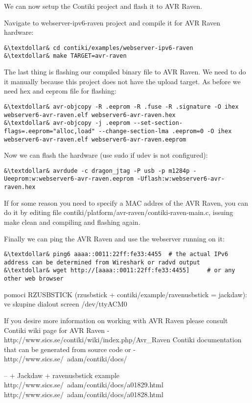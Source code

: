 \documentclass{article}
\begin{document}
We can now setup the Contiki project and flash it to AVR Raven.

Navigate to webserver-ipv6-raven project and compile it for AVR Raven hardware:
\begin{lstlisting}
&\textdollar& cd contiki/examples/webserver-ipv6-raven
&\textdollar& make TARGET=avr-raven
\end{lstlisting}


The last thing is flashing our compiled binary file to AVR Raven. We need to do it manually because this project does not have the upload target.
As before we need hex and eeprom file for flashing:
\begin{lstlisting}
&\textdollar& avr-objcopy -R .eeprom -R .fuse -R .signature -O ihex webserver6-avr-raven.elf webserver6-avr-raven.hex
&\textdollar& avr-objcopy -j .eeprom --set-section-flags=.eeprom="alloc,load" --change-section-lma .eeprom=0 -O ihex webserver6-avr-raven.elf webserver6-avr-raven.eeprom
\end{lstlisting}
Now we can flash the hardware (use sudo if udev is not configured):
\begin{lstlisting}
&\textdollar& avrdude -c dragon_jtag -P usb -p m1284p -Ueeprom:w:webserver6-avr-raven.eeprom -Uflash:w:webserver6-avr-raven.hex
\end{lstlisting}


If for some reason you need to specify a MAC addres of the AVR Raven, you can do it by editing file contiki/platform/avr-raven/contiki-raven-main.c,
issuing make clean and compiling and flashing again.


Finally we can ping the AVR Raven and use the webserver running on it:
\begin{lstlisting}
&\textdollar& ping6 aaaa::0011:22ff:fe33:4455  # the actual IPv6 address can be determined from Wireshark or radvd output
&\textdollar& wget http://[aaaa::0011:22ff:fe33:4455]     # or any other web browser
\end{lstlisting}
 


pomoci RZUSBSTICK (rzusbstick + contiki/example/ravenusbstick = jackdaw):
ve skupine dialout
screen /dev/ttyACM0



If you desire more information on working with AVR Raven please consult
Contiki wiki page for AVR Raven - http://www.sics.se/contiki/wiki/index.php/Avr\_Raven
Contiki documentation that can be generated from source code or - http://www.sics.se/~adam/contiki/docs/

-- + Jackdaw + ravenusbstick example
http://www.sics.se/~adam/contiki/docs/a01829.html
http://www.sics.se/~adam/contiki/docs/a01828.html
\end{document}
